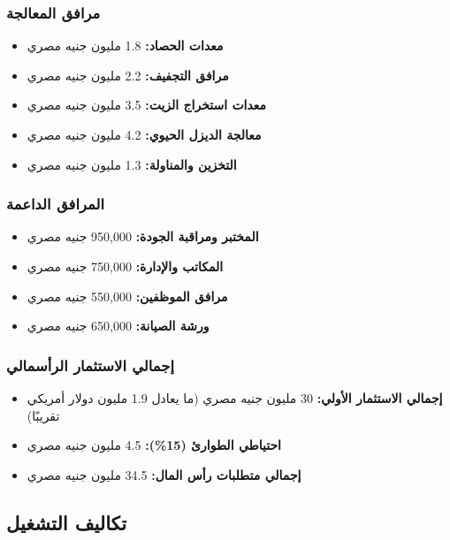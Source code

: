 \subsubsection{مرافق المعالجة}
\begin{itemize}
    \item \textbf{معدات الحصاد:} 1.8 مليون جنيه مصري
    \item \textbf{مرافق التجفيف:} 2.2 مليون جنيه مصري
    \item \textbf{معدات استخراج الزيت:} 3.5 مليون جنيه مصري
    \item \textbf{معالجة الديزل الحيوي:} 4.2 مليون جنيه مصري
    \item \textbf{التخزين والمناولة:} 1.3 مليون جنيه مصري
\end{itemize}

\subsubsection{المرافق الداعمة}
\begin{itemize}
    \item \textbf{المختبر ومراقبة الجودة:} 950,000 جنيه مصري
    \item \textbf{المكاتب والإدارة:} 750,000 جنيه مصري
    \item \textbf{مرافق الموظفين:} 550,000 جنيه مصري
    \item \textbf{ورشة الصيانة:} 650,000 جنيه مصري
\end{itemize}

\subsubsection{إجمالي الاستثمار الرأسمالي}
\begin{itemize}
    \item \textbf{إجمالي الاستثمار الأولي:} 30 مليون جنيه مصري (ما يعادل 1.9 مليون دولار أمريكي تقريبًا)
    \item \textbf{احتياطي الطوارئ (15\%):} 4.5 مليون جنيه مصري
    \item \textbf{إجمالي متطلبات رأس المال:} 34.5 مليون جنيه مصري
\end{itemize}

\subsection{تكاليف التشغيل}


